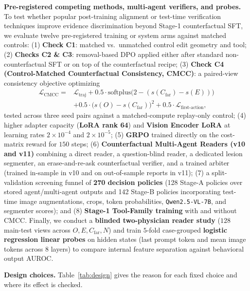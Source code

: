 \documentclass[5p,times,twocolumn,authoryear]{elsarticle}
\begin{document}
\textbf{Pre-registered competing methods, multi-agent verifiers, and probes.} To test whether popular post-training alignment or test-time verification techniques improve evidence discrimination beyond Stage-1 counterfactual SFT, we evaluate twelve pre-registered training or system arms against matched controls:
(1) \textbf{Check C1}: matched vs.\ unmatched control edit geometry and tool;
(2) \textbf{Checks C2 \& C3}: removal-based DPO \citep{rafailov2023dpo} applied either after standard non-counterfactual SFT or on top of the counterfactual recipe;
(3) \textbf{Check C4 (Control-Matched Counterfactual Consistency, CMCC)}: a paired-view consistency objective optimizing
\begin{equation}
\label{eq:cmcc}
\begin{split}
\mathcal{L}_{\text{CMCC}} = {}& \mathcal{L}_{\text{traj}} + 0.5 \cdot \text{softplus}\big(2 - (s(C_{\text{far}}) - s(E))\big)\\
&+ 0.5 \cdot \big(s(O) - s(C_{\text{far}})\big)^2 + 0.5 \cdot \mathcal{L}_{\text{first-action}},
\end{split}
\end{equation}
tested across three seed pairs against a matched-compute replay-only control;
(4) higher adapter capacity (\textbf{LoRA rank 64}) and \textbf{Vision Encoder LoRA} at learning rates $2\times 10^{-4}$ and $2\times 10^{-5}$;
(5) \textbf{GRPO} \citep{shao2024deepseekmath} trained directly on the cost-matrix reward for $150$ steps;
(6) \textbf{Counterfactual Multi-Agent Readers (v10 and v11)} combining a direct reader, a question-blind reader, a dedicated lesion segmenter, an erase-and-re-ask counterfactual verifier, and a trained arbiter (trained in-sample in v10 and on out-of-sample reports in v11);
(7) a split-validation screening funnel of \textbf{270 decision policies} (128 Stage-A policies over stored agent/multi-agent outputs and 142 Stage-B policies incorporating test-time image augmentations, crops, token probabilities, \texttt{Qwen2.5-VL-7B}, and segmenter scores); and
(8) \textbf{Stage-1 Tool-Family training} with and without CMCC.
Finally, we conduct a \textbf{blinded two-physician reader study} ($128$ main-test views across $O, E, C_{\text{far}}, N$) and train $5$-fold case-grouped \textbf{logistic regression linear probes} \citep{alain2016understanding} on hidden states (last prompt token and mean image tokens across $8$ layers) to compare internal feature separation against behavioral output AUROC.

\textbf{Design choices.} Table~\ref{tab:design} gives the reason for each fixed choice and where its effect is checked.
\end{document}
